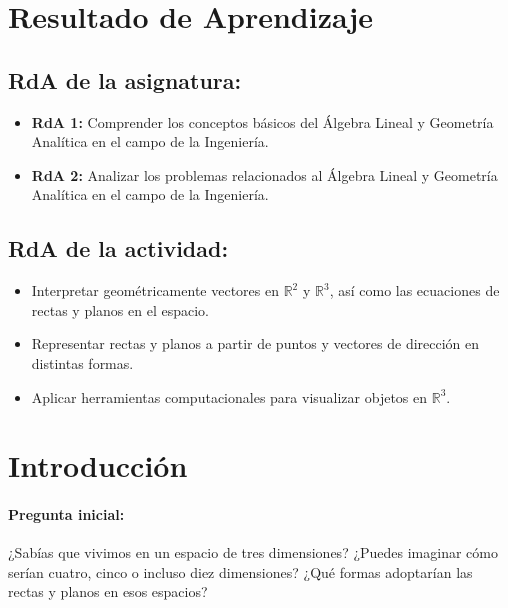 \documentclass[a4,11pt]{aleph-notas}
\begin{document}
\encabezado


\section*{Resultado de Aprendizaje}

\subsection*{RdA de la asignatura:}
\begin{itemize}[leftmargin=*]
    \item \textbf{RdA 1:} Comprender los conceptos básicos del Álgebra Lineal y Geometría Analítica en el campo de la Ingeniería.
    \item \textbf{RdA 2:} Analizar los problemas relacionados al Álgebra Lineal y Geometría Analítica en el campo de la Ingeniería.
\end{itemize}

\subsection*{RdA de la actividad:}  
\begin{itemize}[leftmargin=*]
    \item Interpretar geométricamente vectores en \(\mathbb{R}^2\) y \(\mathbb{R}^3\), así como las ecuaciones de rectas y planos en el espacio.
    \item Representar rectas y planos a partir de puntos y vectores de dirección en distintas formas.
    \item Aplicar herramientas computacionales para visualizar objetos en \(\mathbb{R}^3\).
\end{itemize}

\section*{Introducción}  

\paragraph{Pregunta inicial:}  
¿Sabías que vivimos en un espacio de tres dimensiones? ¿Puedes imaginar cómo serían cuatro, cinco o incluso diez dimensiones? ¿Qué formas adoptarían las rectas y planos en esos espacios?
\end{document}
